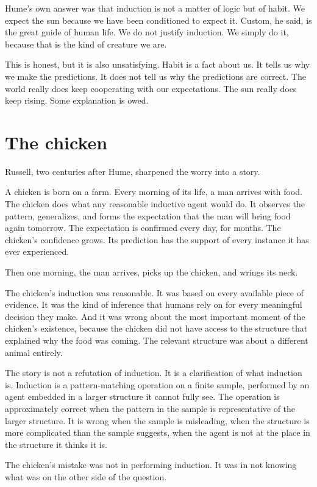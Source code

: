 Hume's own answer was that induction is not a matter of logic but of habit. We expect the sun because we have been conditioned to expect it. Custom, he said, is the great guide of human life. We do not justify induction. We simply do it, because that is the kind of creature we are.

This is honest, but it is also unsatisfying. Habit is a fact about us. It tells us why we make the predictions. It does not tell us why the predictions are correct. The world really does keep cooperating with our expectations. The sun really does keep rising. Some explanation is owed.

\section*{The chicken}

Russell, two centuries after Hume, sharpened the worry into a story.

A chicken is born on a farm. Every morning of its life, a man arrives with food. The chicken does what any reasonable inductive agent would do. It observes the pattern, generalizes, and forms the expectation that the man will bring food again tomorrow. The expectation is confirmed every day, for months. The chicken's confidence grows. Its prediction has the support of every instance it has ever experienced.

Then one morning, the man arrives, picks up the chicken, and wrings its neck.

The chicken's induction was reasonable. It was based on every available piece of evidence. It was the kind of inference that humans rely on for every meaningful decision they make. And it was wrong about the most important moment of the chicken's existence, because the chicken did not have access to the structure that explained why the food was coming. The relevant structure was about a different animal entirely.

The story is not a refutation of induction. It is a clarification of what induction is. Induction is a pattern-matching operation on a finite sample, performed by an agent embedded in a larger structure it cannot fully see. The operation is approximately correct when the pattern in the sample is representative of the larger structure. It is wrong when the sample is misleading, when the structure is more complicated than the sample suggests, when the agent is not at the place in the structure it thinks it is.

The chicken's mistake was not in performing induction. It was in not knowing what was on the other side of the question.


